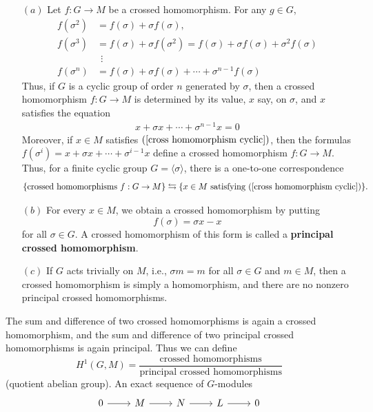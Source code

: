 \begin{example}
\mbox{}
\begin{itemize}
\item[$(a)$] Let $f:G\to M$ be a crossed homomorphism. For any $g\in G$,
\begin{equation*}
\begin{aligned}
f(\sigma^2)&=f(\sigma)+\sigma f(\sigma),\\
f(\sigma^3)&=f(\sigma)+\sigma f(\sigma^2)=f(\sigma)+\sigma f(\sigma)+\sigma^2 f(\sigma)\\
&\ \ \vdots\\
f(\sigma^n)&=f(\sigma)+\sigma f(\sigma)+\cdots+\sigma^{n-1}f(\sigma)
\end{aligned}
\end{equation*}
Thus, if $G$ is a cyclic group of order $n$ generated by $\sigma$, then a crossed homomorphism $f:G\to M$ is determined by its value, $x$ say, on $\sigma$, and $x$ satisfies the equation
\begin{align}\label{cross homomorphism cyclic}
x+\sigma x+\cdots+\sigma^{n-1}x=0
\end{align}
Moreover, if $x\in M$ satisfies $(\ref{cross homomorphism cyclic})$, then the formulas $f(\sigma^i)=x+\sigma x+\cdots+\sigma^{i-1}x$ define a crossed homomorphism $f:G\to M$. Thus, for a finite cyclic group $G=\langle\sigma\rangle$, there is a one-to-one correspondence
\[\{\text{crossed homomorphisms $f:G\to M$}\}\leftrightarrows\{\text{$x\in M$ satisfying $(\ref{cross homomorphism cyclic})$}\}.\]
\item[$(b)$] For every $x\in M$, we obtain a crossed homomorphism by putting
\[f(\sigma)=\sigma x-x\] 
for all $\sigma\in G$. A crossed homomorphism of this form is called a \textbf{principal crossed homomorphism}.
\item[$(c)$] If $G$ acts trivially on $M$, i.e., $\sigma m=m$ for all $\sigma\in G$ and $m\in M$, then a crossed homomorphism is simply a homomorphism, and there are no nonzero principal crossed homomorphisms.
\end{itemize}
\end{example}
The sum and difference of two crossed homomorphisms is again a crossed homomorphism, and the sum and difference of two principal crossed homomorphisms is again principal. Thus we can define
\[H^1(G,M)=\frac{\text{crossed homomorphisms}}{\text{principal crossed homomorphisms}}\]
(quotient abelian group). An exact sequence of $G$-modules
\[\begin{tikzcd}
0\ar[r]&M\ar[r]&N\ar[r]&L\ar[r]&0
\end{tikzcd}\]
